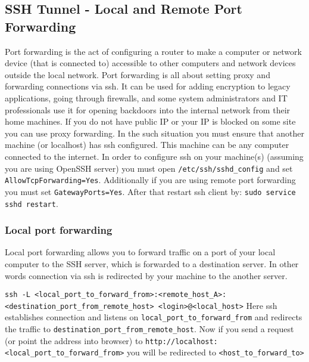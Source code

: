 \documentclass{article}[12pt]
\newcommand{\q}[1]{\texttt{#1}}
\begin{document}
\subsection{SSH Tunnel - Local and Remote Port Forwarding}
Port forwarding is the act of configuring a router to make a computer or network device (that is connected to) accessible to other computers and network devices outside the local network.
Port forwarding is all about setting proxy and forwarding connections via ssh.
It can be used for adding encryption to legacy applications, going through firewalls, and some system administrators and IT professionals use it for opening backdoors into the internal network from their home machines.
If you do not have public IP or your IP is blocked on some site you can use proxy forwarding.
In the such situation you must ensure that another machine (or localhost) has ssh configured.
This machine can be any computer connected to the internet.
In order to configure ssh on your machine(s) (assuming you are using OpenSSH server) you must open \q{/etc/ssh/sshd\_config} and set \q{AllowTcpForwarding=Yes}.
Additionally if you are using remote port forwarding you must set \q{GatewayPorts=Yes}.
After that restart ssh client by: \q{sudo service sshd restart}.

\subsubsection{Local port forwarding}
Local port forwarding allows you to forward traffic on a port of your local computer to the SSH server, which is forwarded to a destination server.
In other words connection via ssh is redirected by your machine to the another server.


\texttt{ssh -L <local\_port\_to\_forward\_from>:<remote\_host\_A>:<destination\_port\_from\_remote\_host> <login>@<local\_host>} \newline\newline
Here ssh establishes connection and listens on \q{local\_port\_to\_forward\_from} and redirects the traffic to \q{destination\_port\_from\_remote\_host}.
Now if you send a request (or point the address into browser) to \q{http://localhost:<local\_port\_to\_forward\_from>} you will be redirected to \q{<host\_to\_forward\_to>}
\end{document}
